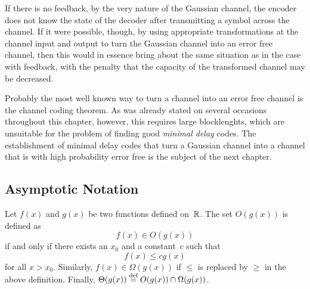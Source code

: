 If there is no feedback, by the very nature of the Gaussian channel, the encoder
does not know the state of the decoder after transmitting a symbol across the
channel. If it were possible, though, by using appropriate transformations at
the channel input and output to turn the Gaussian channel into an error free
channel, then this would in essence bring about the same situation as in the
case with feedback, with the penalty that the capacity of the transformed
channel may be decreased.

Probably the most well known way to turn a channel into an error free channel is
the channel coding theorem. As was already stated on several occasions
throughout this chapter, however, this requires large blocklenghts, which are
unsuitable for the problem of finding good \emph{minimal delay} codes. The
establishment of minimal delay codes that turn a Gaussian channel into a channel
that is with high probability error free is the subject of the next chapter. 

\begin{subappendices}
  \section{Asymptotic Notation}\label{app:asymptotic}

  \begin{definition}
    \label{def:bigo}
    Let $f(x)$ and $g(x)$ be two functions defined on~$\mathbb{R}$. The set $O(g(x))$ is
    defined as
    \begin{equation*}
      f(x) \in O(g(x))
    \end{equation*}
    if and only if there exists an $x_0$ and a constant~$c$ such that
    \begin{equation*}
      f(x) \le c g(x)
    \end{equation*}
    for all $x > x_0$. 
    Similarly, $f(x) \in \Omega(g(x))$ if $\le$ is replaced by $\ge$ in
    the above definition. Finally, $\Theta(g(x)) \stackrel{\text{def}}{=} O(g(x)) \cap
    \Omega(g(x))$.
  \end{definition}

\end{subappendices}
